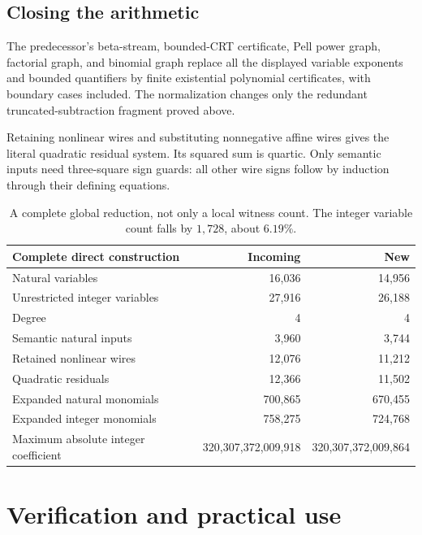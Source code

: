 \documentclass[11pt,letterpaper]{article}
\theoremstyle{remark}\newtheorem{remark}[theorem]{Remark}
\begin{document}
\subsection{Closing the arithmetic}
The predecessor's beta-stream, bounded-CRT certificate, Pell power graph,
factorial graph, and binomial graph replace all the displayed variable
exponents and bounded quantifiers by finite existential polynomial
certificates, with boundary cases included. The normalization changes only
the redundant truncated-subtraction fragment proved above.

Retaining nonlinear wires and substituting nonnegative affine wires gives
the literal quadratic residual system. Its squared sum is quartic.
Only semantic inputs need three-square sign guards: all other wire signs
follow by induction through their defining equations.

\begin{table}[ht]
\centering\small
\begin{tabular}{@{}lrr@{}}
\toprule
Complete direct construction & Incoming & New\\
\midrule
Natural variables &16,036&14,956\\
Unrestricted integer variables &27,916&26,188\\
Degree &4&4\\
Semantic natural inputs &3,960&3,744\\
Retained nonlinear wires &12,076&11,212\\
Quadratic residuals &12,366&11,502\\
Expanded natural monomials &700,865&670,455\\
Expanded integer monomials &758,275&724,768\\
Maximum absolute integer coefficient &320,307,372,009,918&
320,307,372,009,864\\
\bottomrule
\end{tabular}
\caption{A complete global reduction, not only a local witness count.
The integer variable count falls by $1{,}728$, about $6.19\%$.}
\end{table}

\section{Verification and practical use}
\end{document}
